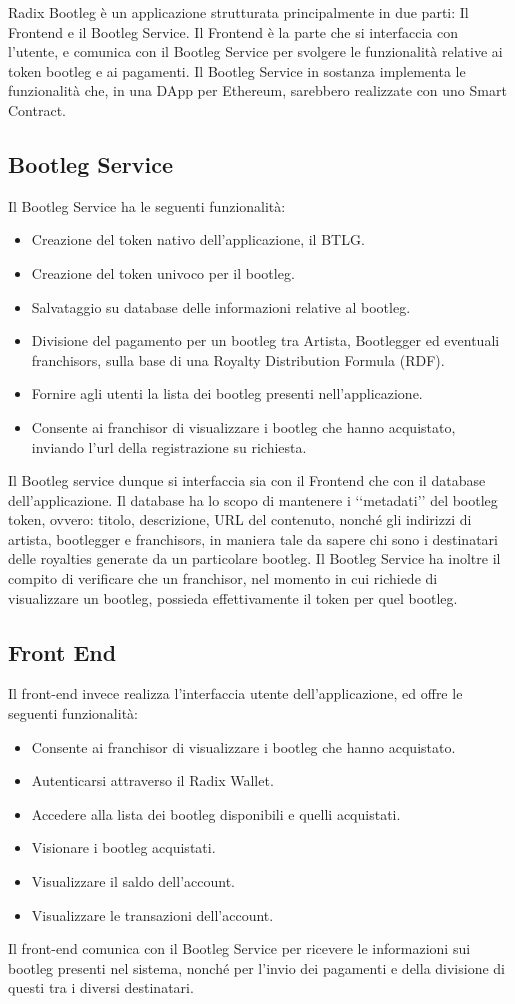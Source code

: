 Radix Bootleg è un applicazione strutturata principalmente in due parti: Il Frontend e il Bootleg Service. Il Frontend è la parte che si interfaccia con l'utente, e comunica con il Bootleg Service per svolgere le funzionalità relative ai token bootleg e ai pagamenti. Il Bootleg Service in sostanza implementa le funzionalità che, in una DApp per Ethereum, sarebbero realizzate con uno Smart Contract.

\subsection{Bootleg Service}

Il Bootleg Service ha le seguenti funzionalità:
\begin{itemize}
    \item Creazione del token nativo dell'applicazione, il BTLG.
    \item Creazione del token univoco per il bootleg.
    \item Salvataggio su database delle informazioni relative al bootleg.
    \item Divisione del pagamento per un bootleg tra Artista, Bootlegger ed eventuali franchisors, sulla base di una Royalty Distribution Formula (RDF).
    \item Fornire agli utenti la lista dei bootleg presenti nell'applicazione.
    \item Consente ai franchisor di visualizzare i bootleg che hanno acquistato, inviando l'url della registrazione su richiesta.
\end{itemize}

Il Bootleg service dunque si interfaccia sia con il Frontend che con il database dell'applicazione. Il database ha lo scopo di mantenere i ‘‘metadati’’ del bootleg token, ovvero: titolo, descrizione, URL del contenuto, nonché gli indirizzi di artista, bootlegger e franchisors, in maniera tale da sapere chi sono i destinatari delle royalties generate da un particolare bootleg. Il Bootleg Service ha inoltre il compito di verificare che un franchisor, nel momento in cui richiede di visualizzare un bootleg, possieda effettivamente il token per quel bootleg.

\subsection{Front End}

Il front-end invece realizza l'interfaccia utente dell'applicazione, ed offre le seguenti funzionalità:
\begin{itemize}
    \item Consente ai franchisor di visualizzare i bootleg che hanno acquistato.
    \item Autenticarsi attraverso il Radix Wallet.
    \item Accedere alla lista dei bootleg disponibili e quelli acquistati.
    \item Visionare i bootleg acquistati.
    \item Visualizzare il saldo dell'account.
    \item Visualizzare le transazioni dell'account.
\end{itemize}

Il front-end comunica con il Bootleg Service per ricevere le informazioni sui bootleg presenti nel sistema, nonché per l'invio dei pagamenti e della divisione di questi tra i diversi destinatari.